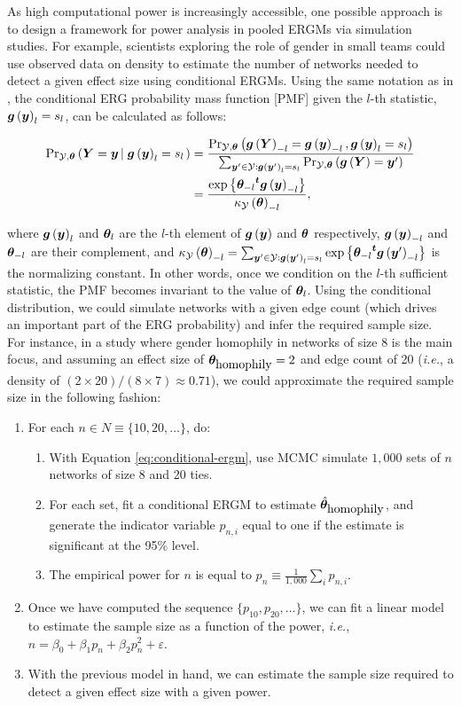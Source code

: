 \documentclass[12pt]{article}
\begin{document}
As high computational power is increasingly accessible, one possible approach is to design a framework for power analysis in pooled ERGMs via simulation studies. For example, scientists exploring the role of gender in small teams could use observed data on density to estimate the number of networks needed to detect a given effect size using conditional ERGMs.  Using the same notation as in \cite{krivitskyTaleTwoDatasets2022}, the conditional ERG probability mass function [PMF] given the $l$-th statistic, $\bm{g}\left(\bm{y}\right)_l = s_l$, can be calculated as follows:

\begin{align}
\notag\Prcond{\Graph = \g}{\s{\g}_l = s_l}  & = \frac{%
	\Pr{\s{\Graph}_{-l} = \s{\g}_{-l}, \s{\g}_l = s_l}
}{%
	\sum_{\g'\in\GRAPH:\s{\g'}_l = s_l}\Pr{\s{\Graph} = \g'}%
} \\ & =  %
\frac{%
	\exp{\t{\coef_{-l}}\s{\g}_{-l}}
}{%
	\normconst_{-l}
}, \label{eq:conditional-ergm}
\end{align}


\noindent where $\bm{g}\left(\bm{y}\right)_l$ and $\bm{\theta}_l$ are the $l$-th element of $\bm{g}\left(\bm{y}\right)$ and $\bm{\theta}$ respectively, $\bm{g}\left(\bm{y}\right)_{-l}$ and $\bm{\theta}_{-l}$ are their complement, and $\kappa_{\mathcal{Y}}\left(\bm{\theta}\right)_{-l} = \sum_{\bm{y}' \in \mathcal{Y}: \bm{g}\left(\bm{y}'\right)_l = s_l}\mbox{exp}\left\{{\bm{\theta}_{-l}}^{\bm{t}}\bm{g}\left(\bm{y}'\right)_{-l}\right\}$ is the normalizing constant. In other words, once we condition on the $l$-th sufficient statistic, the PMF becomes invariant to the value of $\bm{\theta}_l$. Using the conditional distribution, we could simulate networks with a given edge count (which drives an important part of the ERG probability) and infer the required sample size. For instance, in a study where gender homophily in networks of size 8 is the main focus, and assuming an effect size of $\bm{\theta}_{\mbox{homophily}} = 2$ and edge count of 20 (\textit{i.e.}, a density of $(2\times 20)/(8 \times 7) \approx 0.71$), we could approximate the required sample size in the following fashion:

\begin{enumerate}
  \item For each $n \in N \equiv \{10, 20, \dots\}$, do:
  \begin{enumerate}
    \item With Equation \eqref{eq:conditional-ergm}, use MCMC simulate $1,000$ sets of $n$ networks of size 8 and 20 ties.
    \item For each set, fit a conditional ERGM to estimate $\hat{\bm{\theta}}_{\mbox{homophily}}$, and generate the indicator variable $p_{n, i}$ equal to one if the estimate is significant at the 95\% level.
    \item The empirical power for $n$ is equal to $p_n \equiv \frac{1}{1,000}\sum_{i}p_{n, i}$.
  \end{enumerate}
  \item Once we have computed the sequence $\{p_{10}, p_{20}, \dots\}$, we can fit a linear model to estimate the sample size as a function of the power, \textit{i.e.}, $n = \beta_0 + \beta_1 p_n + \beta_2 p_n^2 + \varepsilon$.
  \item With the previous model in hand, we can estimate the sample size required to detect a given effect size with a given power.
\end{enumerate}
\end{document}
